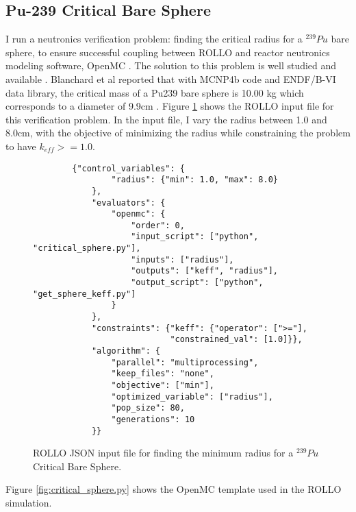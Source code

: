 \subsection{Pu-239 Critical Bare Sphere}
I run a neutronics verification problem: finding the critical radius for a $^{239}Pu$ 
bare sphere, to ensure successful coupling between \gls{ROLLO} and reactor neutronics 
modeling software, OpenMC \cite{romano_openmc:_2015}. 
The solution to this problem is well studied and available \cite{blanchard_updated_1999}. 
Blanchard et al reported that with MCNP4b code and ENDF/B-VI data library, the 
critical mass of a Pu239 bare sphere is 10.00 kg which corresponds to a diameter 
of 9.9cm \cite{blanchard_updated_1999}.
Figure \ref{fig:verification-sphere} shows the ROLLO input file for this verification 
problem. 
In the input file, I vary the radius between 1.0 and 8.0cm, with the objective of 
minimizing the radius while constraining the problem to have $k_{eff} >= 1.0$.
\begin{figure}[htbp]
    \begin{verbatim}
        {"control_variables": {
                "radius": {"min": 1.0, "max": 8.0}
            },
            "evaluators": {
                "openmc": {
                    "order": 0,
                    "input_script": ["python", "critical_sphere.py"],
                    "inputs": ["radius"],
                    "outputs": ["keff", "radius"],
                    "output_script": ["python", "get_sphere_keff.py"]
                }
            },
            "constraints": {"keff": {"operator": [">="], 
                            "constrained_val": [1.0]}},
            "algorithm": {
                "parallel": "multiprocessing",
                "keep_files": "none",
                "objective": ["min"],
                "optimized_variable": ["radius"],
                "pop_size": 80,
                "generations": 10
            }}
    \end{verbatim}
    \caption{\acrfull{ROLLO} JSON input file for finding the minimum radius for 
    a $^{239}Pu$ Critical Bare Sphere.}
    \label{fig:verification-sphere}
\end{figure}
\pagebreak
Figure \ref{fig:critical_sphere.py} shows the OpenMC template used in the 
\gls{ROLLO} simulation. 
